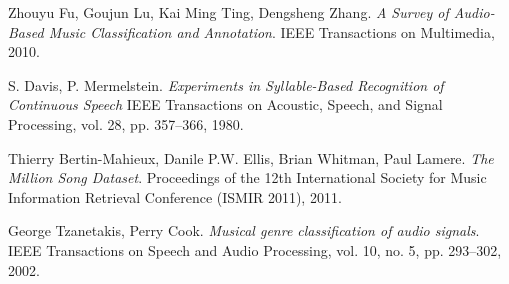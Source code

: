 \documentclass{article} %
\begin{document}
\begin{thebibliography}{10}
Zhouyu Fu, Goujun Lu, Kai Ming Ting, Dengsheng Zhang.
\textit{A Survey of Audio-Based Music Classification and Annotation}.
IEEE Transactions on Multimedia, 2010.

S. Davis, P. Mermelstein.
\textit{Experiments in Syllable-Based Recognition of Continuous Speech}
IEEE Transactions on Acoustic, Speech, and Signal Processing, vol. 28, pp. 357--366, 1980.

Thierry Bertin-Mahieux, Danile P.W. Ellis, Brian Whitman, Paul Lamere.
\textit{The Million Song Dataset}.
Proceedings of the 12th International Society for Music Information Retrieval Conference (ISMIR 2011), 2011.

George Tzanetakis, Perry Cook.
\textit{Musical genre classification of audio signals}.
IEEE Transactions on Speech and Audio Processing, vol. 10, no. 5, pp. 293--302, 2002.
\end{thebibliography}
\end{document}
